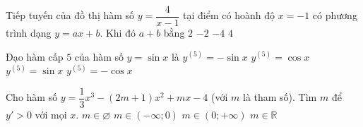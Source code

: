 \begin{ex}%
	Tiếp tuyến của đồ thị hàm số $y=\dfrac{4}{x-1}$ tại điểm có hoành độ $x=-1$ có phương trình dạng $y=ax+b$. Khi đó $a+b$ bằng
	\choice
	{$2 $}
	{$-2 $}
	{\True $-4 $}
	{$4 $}
\end{ex}

\begin{ex}%
	Đạo hàm cấp $5$ của hàm số $y=\sin x$ là
	\choice
	{$y^{(5)}=-\sin x $}
	{\True $y^{(5)}=\cos x $}
	{$y^{(5)}=\sin x $}
	{$y^{(5)}=-\cos x $}
\end{ex}

\begin{ex}%
	Cho hàm số $y=\dfrac{1}{3}x^3-(2m+1)x^2+mx-4$ (với $m$ là tham số). Tìm $m$ để $y'>0$ với mọi $x$.
	\choice
	{\True $m\in \varnothing $}
	{$m\in (-\infty;0) $}
	{$m\in (0;+\infty) $}
	{$m\in \mathbb{R} $}
\end{ex}

